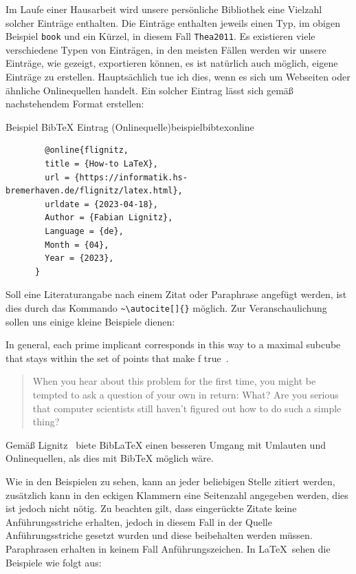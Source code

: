 Im Laufe einer Hausarbeit wird unsere persönliche Bibliothek eine Vielzahl
solcher Einträge enthalten. Die Einträge enthalten jeweils einen Typ, im obigen
Beispiel \texttt{book} und ein Kürzel, in diesem Fall \texttt{Thea2011}. Es 
existieren viele verschiedene Typen von Einträgen, in den meisten Fällen werden
wir unsere Einträge, wie gezeigt, exportieren können, es ist natürlich auch
möglich, eigene Einträge zu erstellen. Hauptsächlich tue ich dies, wenn es sich
um Webseiten oder ähnliche Onlinequellen handelt. 
Ein solcher Eintrag lässt sich gemäß nachstehendem Format erstellen: 
\newpage
\vspace*{-0.7cm}
\begin{code}{Beispiel BibTeX Eintrag (Onlinequelle)}{beispielbibtexonline}
	\begin{verbatim}
		@online{flignitz,
		title = {How-to LaTeX},
		url = {https://informatik.hs-bremerhaven.de/flignitz/latex.html},
		urldate = {2023-04-18},
		Author = {Fabian Lignitz},
		Language = {de},
		Month = {04},
		Year = {2023},
	  }
	\end{verbatim}
\end{code}

Soll eine Literaturangabe nach einem Zitat oder Paraphrase angefügt werden, ist
dies durch das Kommando \texttt{\textasciitilde\textbackslash autocite[]\{\}}
möglich. Zur Veranschaulichung sollen uns einige kleine Beispiele dienen: 

\glqq In general, each prime implicant corresponds in this way to a maximal
subcube that stays within the set of points that make f
true~\autocite[]{KnutThea2009}.\grqq{}

\begin{quote}
	\footnotesize{	
	When you hear about this problem for the first time, you might be tempted
	to ask a question of your own in return: \glqq What? Are you serious that computer
	scientists still haven’t figured out how to do such a simple
	thing?\grqq{}~\autocite[S.432]{KnutThea2009}
	}
\end{quote}

Gemäß Lignitz~\autocite[]{flignitz} biete BibLaTeX einen besseren Umgang mit
Umlauten und Onlinequellen, als dies mit BibTeX möglich wäre.

Wie in den Beispielen zu sehen, kann an jeder beliebigen Stelle zitiert werden,
zusätzlich kann in den eckigen Klammern eine Seitenzahl angegeben werden, dies
ist jedoch nicht nötig. Zu beachten gilt, dass eingerückte Zitate keine
Anführungsstriche erhalten, jedoch in diesem Fall in der Quelle
Anführungsstriche gesetzt wurden und diese beibehalten werden müssen. Paraphrasen 
erhalten in keinem Fall Anführungszeichen. In \LaTeX~sehen die Beispiele wie folgt aus: 

